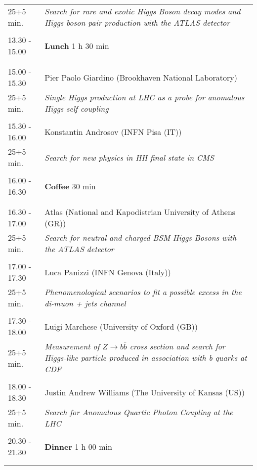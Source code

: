 \begin{longtable}{p{3cm}p{13cm}}
25+5 min. & {\it Search for rare and exotic Higgs Boson decay modes and Higgs boson pair production with the ATLAS detector}\\ 
 & \\ 
13.30 - 15.00 & {\bf Lunch} \hfill 1 h 30 min \\ 
 & \\ 
 & \\ 
15.00 - 15.30 & Pier Paolo Giardino (Brookhaven National Laboratory)\\ 
25+5 min. & {\it Single Higgs production at LHC as a probe for anomalous Higgs self coupling}\\ 
 & \\ 
15.30 - 16.00 & Konstantin Androsov (INFN Pisa (IT))\\ 
25+5 min. & {\it Search for new physics in HH final state in CMS}\\ 
 & \\ 
16.00 - 16.30 & {\bf Coffee} \hfill 30 min \\ 
 & \\ 
 & \\ 
16.30 - 17.00 & Atlas (National and Kapodistrian University of Athens (GR))\\ 
25+5 min. & {\it Search for neutral and charged BSM Higgs Bosons with the ATLAS detector}\\ 
 & \\ 
17.00 - 17.30 & Luca Panizzi (INFN Genova (Italy))\\ 
25+5 min. & {\it Phenomenological scenarios to fit a possible excess in the di-muon + jets channel}\\ 
 & \\ 
17.30 - 18.00 & Luigi Marchese (University of Oxford (GB))\\ 
25+5 min. & {\it Measurement of $Z \rightarrow b\bar{b}$ cross section and search for Higgs-like particle produced in association with b quarks at CDF}\\ 
 & \\ 
18.00 - 18.30 & Justin Andrew Williams (The University of Kansas (US))\\ 
25+5 min. & {\it Search for Anomalous Quartic Photon Coupling at the LHC}\\ 
 & \\ 
20.30 - 21.30 & {\bf Dinner} \hfill 1 h 00 min \\ 
 & \\ 
 & \\ 
\end{longtable}

